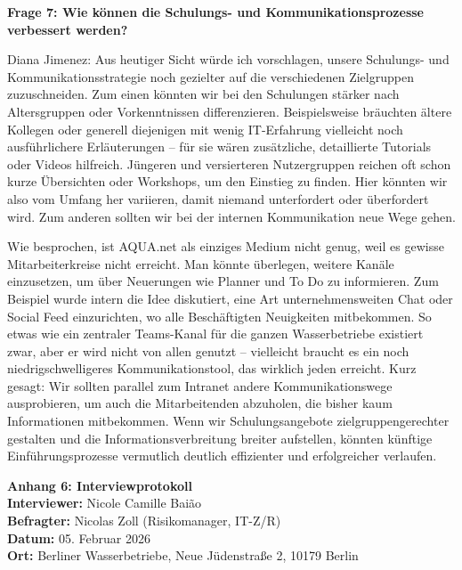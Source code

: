 \documentclass[
    12pt, 
    a4paper,
    ]{scrartcl} %
\begin{document}
\textbf{Frage 7: Wie können die Schulungs- und Kommunikationsprozesse verbessert werden?}

Diana Jimenez: Aus heutiger Sicht würde ich vorschlagen, unsere Schulungs- und Kommunikationsstrategie noch gezielter auf die verschiedenen Zielgruppen zuzuschneiden. Zum einen könnten wir bei den Schulungen stärker nach Altersgruppen oder Vorkenntnissen differenzieren. Beispielsweise bräuchten ältere Kollegen oder generell diejenigen mit wenig IT-Erfahrung vielleicht noch ausführlichere Erläuterungen – für sie wären zusätzliche, detaillierte Tutorials oder Videos hilfreich. Jüngeren und versierteren Nutzergruppen reichen oft schon kurze Übersichten oder Workshops, um den Einstieg zu finden. Hier könnten wir also vom Umfang her variieren, damit niemand unterfordert oder überfordert wird. Zum anderen sollten wir bei der internen Kommunikation neue Wege gehen. 

Wie besprochen, ist AQUA.net als einziges Medium nicht genug, weil es gewisse Mitarbeiterkreise nicht erreicht. Man könnte überlegen, weitere Kanäle einzusetzen, um über Neuerungen wie Planner und To Do zu informieren. Zum Beispiel wurde intern die Idee diskutiert, eine Art unternehmensweiten Chat oder Social Feed einzurichten, wo alle Beschäftigten Neuigkeiten mitbekommen. So etwas wie ein zentraler Teams-Kanal für die ganzen Wasserbetriebe existiert zwar, aber er wird nicht von allen genutzt – vielleicht braucht es ein noch niedrigschwelligeres Kommunikationstool, das wirklich jeden erreicht. Kurz gesagt: Wir sollten parallel zum Intranet andere Kommunikationswege ausprobieren, um auch die Mitarbeitenden abzuholen, die bisher kaum Informationen mitbekommen. Wenn wir Schulungsangebote zielgruppengerechter gestalten und die Informationsverbreitung breiter aufstellen, könnten künftige Einführungsprozesse vermutlich deutlich effizienter und erfolgreicher verlaufen.

\newpage
{}
{}
\label{sec:Anhang6}

{\Large\bfseries Anhang 6: Interviewprotokoll}\\[1em]
\textbf{Interviewer:} Nicole Camille Baião \\
\textbf{Befragter:} Nicolas Zoll (Risikomanager, IT-Z/R) \\
\textbf{Datum:} 05. Februar 2026 \\
\textbf{Ort:} Berliner Wasserbetriebe, Neue Jüdenstraße 2, 10179 Berlin \\
\end{document}
